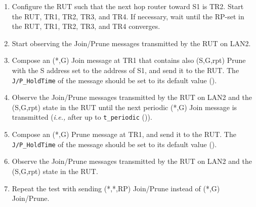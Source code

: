 \documentclass[11pt]{report}
\newcommand{\ie}{\emph{i.e.,}\xspace}
\begin{document}
\begin{enumerate}

  \item Configure the RUT such that the next hop router toward S1 is
  TR2. Start the RUT, TR1, TR2, TR3, and TR4. If necessary, wait until the
  RP-set in the RUT, TR1, TR2, TR3, and TR4 converges.

  \item Start observing the Join/Prune messages transmitted by the RUT on
  LAN2.

  \item Compose an (*,G) Join message at TR1 that contains also (S,G,rpt)
  Prune with the S address set to the address of S1, and send it to the RUT.
  The \verb=J/P_HoldTime= of the message should be set to its default
  value ({\PimsmJPHoldTime}).

  \item Observe the Join/Prune messages transmitted by the RUT on LAN2 and the
  (S,G,rpt) state in the RUT until the next periodic (*,G) Join message is
  transmitted (\ie after up to \verb=t_periodic= ({\PimsmTPeriodic})).

  \item Compose an (*,G) Prune message at TR1, and send it to the RUT. 
  The \verb=J/P_HoldTime= of the message should be set to its default
  value ({\PimsmJPHoldTime}).

  \item Observe the Join/Prune messages transmitted by the RUT on LAN2 and the
  (S,G,rpt) state in the RUT.

  \item Repeat the test with sending (*,*,RP) Join/Prune instead of (*,G)
  Join/Prune.

\end{enumerate}

\end{document}
